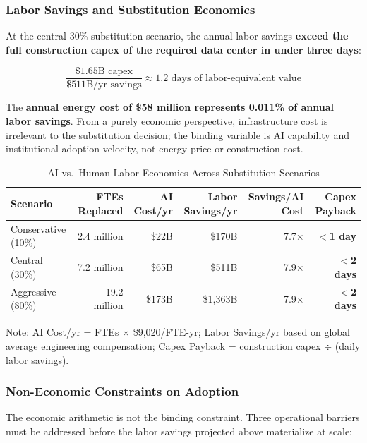 \documentclass{article}
\begin{document}
\subsubsection{Labor Savings and Substitution Economics}

At the central 30\% substitution scenario, the annual labor savings \textbf{exceed the
full construction capex of the required data center in under three days}:

\[
\frac{\$1.65\text{B capex}}{\$511\text{B/yr savings}} \approx 1.2\text{ days of labor-equivalent value}
\]

The \textbf{annual energy cost of \$58 million represents 0.011\% of annual labor savings}.
From a purely economic perspective, infrastructure cost is irrelevant to the substitution
decision; the binding variable is AI capability and institutional adoption velocity, not
energy price or construction cost.

\begin{table}[ht]
\centering
\caption{AI vs.\ Human Labor Economics Across Substitution Scenarios}
\label{tab:labor-savings}
\small
\begin{tabular}{@{}lrrrrr@{}}
\toprule
\textbf{Scenario} & \textbf{FTEs Replaced} & \textbf{AI Cost/yr} & \textbf{Labor Savings/yr} & \textbf{Savings/AI Cost} & \textbf{Capex Payback} \\
\midrule
Conservative (10\%) & 2.4 million & \$22B & \$170B & 7.7$\times$ & \textbf{$<$1 day} \\
Central (30\%) & 7.2 million & \$65B & \$511B & 7.9$\times$ & \textbf{$<$2 days} \\
Aggressive (80\%) & 19.2 million & \$173B & \$1,363B & 7.9$\times$ & \textbf{$<$2 days} \\
\bottomrule
\end{tabular}
\end{table}

\noindent Note: AI Cost/yr = FTEs $\times$ \$9,020/FTE-yr; Labor Savings/yr based on global average engineering
compensation; Capex Payback = construction capex $\div$ (daily labor savings).

\subsubsection{Non-Economic Constraints on Adoption}

The economic arithmetic is not the binding constraint. Three operational barriers must be
addressed before the labor savings projected above materialize at scale:
\end{document}
